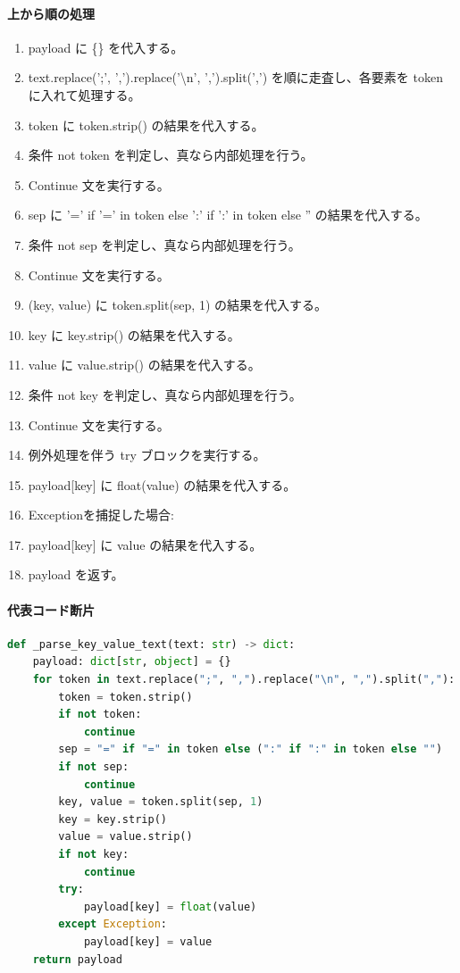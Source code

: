 \documentclass[a4paper,11pt]{article}
\begin{document}
            \paragraph{上から順の処理}
            \begin{enumerate}[leftmargin=1.8em]
            \item payload に \{\} を代入する。
\item text.replace(';', ',').replace('\textbackslash{}n', ',').split(',') を順に走査し、各要素を token に入れて処理する。
\item   token に token.strip() の結果を代入する。
\item   条件 not token を判定し、真なら内部処理を行う。
\item     Continue 文を実行する。
\item   sep に '=' if '=' in token else ':' if ':' in token else '' の結果を代入する。
\item   条件 not sep を判定し、真なら内部処理を行う。
\item     Continue 文を実行する。
\item   (key, value) に token.split(sep, 1) の結果を代入する。
\item   key に key.strip() の結果を代入する。
\item   value に value.strip() の結果を代入する。
\item   条件 not key を判定し、真なら内部処理を行う。
\item     Continue 文を実行する。
\item   例外処理を伴う try ブロックを実行する。
\item     payload[key] に float(value) の結果を代入する。
\item     Exceptionを捕捉した場合:
\item     payload[key] に value の結果を代入する。
\item payload を返す。
            \end{enumerate}
            \paragraph{代表コード断片}
            \begin{lstlisting}[language=Python]
def _parse_key_value_text(text: str) -> dict:
    payload: dict[str, object] = {}
    for token in text.replace(";", ",").replace("\n", ",").split(","):
        token = token.strip()
        if not token:
            continue
        sep = "=" if "=" in token else (":" if ":" in token else "")
        if not sep:
            continue
        key, value = token.split(sep, 1)
        key = key.strip()
        value = value.strip()
        if not key:
            continue
        try:
            payload[key] = float(value)
        except Exception:
            payload[key] = value
    return payload
\end{lstlisting}
\end{document}
